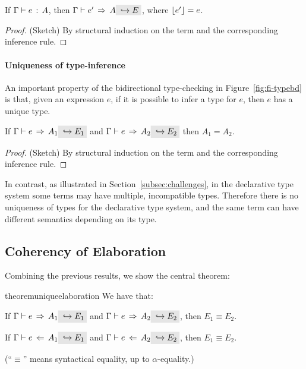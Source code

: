 \begin{theorem}
If $ \Gamma \vdash e \ \!:\! \ A$, then $ \jinfer \Gamma {e'} A \yields E$, where $\lfloor e' \rfloor = e$.
\end{theorem}

\begin{proof}
  (Sketch) By structural induction on the term and the corresponding
  inference rule.
\end{proof}

\paragraph{Uniqueness of type-inference} An important property of the
bidirectional type-checking in Figure~\ref{fig:fi-typebd} is that, given an expression $e$, if it is
possible to infer a type for $e$, then $e$ has a unique type.

\begin{theorem}
\label{theorem:uniqueness-type-inference}
If $\jinfer \Gamma e {A_1} \yields {E_1}$ and $\jinfer \Gamma e {A_2} \yields {E_2}$ then 
${A_1} = {A_2}$.
\end{theorem}

\begin{proof}
  (Sketch) By structural induction on the term and the corresponding
  inference rule.
\end{proof}

In contrast, as illustrated in Section~\ref{subsec:challenges}, in the declarative type
system some terms may have multiple, incompatible types. Therefore
there is no uniqueness of types for the declarative type system, and
the same term can have different semantics depending on its type.

\subsection{Coherency of Elaboration}

Combining the previous results, we show the central theorem:

\begin{restatable}{theorem}{uniqueelaboration}
  \label{theorem:unique-elaboration}
  We have that:
  \begin{itemize*}
    \item If $\jinfer \Gamma e {A_1} \yields {E_1}$ and $\jinfer \Gamma e {A_2} \yields
          {E_2}$, then $E_1 \equiv E_2$. 
    \item If $\jcheck \Gamma e {A_1} \yields {E_1}$ and $\jcheck \Gamma e {A_2} \yields
          {E_2}$, then $E_1 \equiv E_2$.
  \end{itemize*}(``$\equiv$'' means syntactical equality, up to
  $\alpha$-equality.)
  

\end{restatable}

